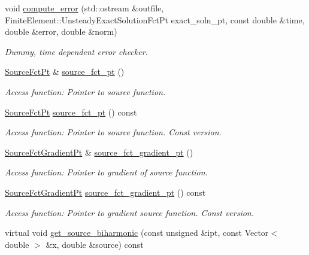 \begin{DoxyCompactItemize}
void \hyperlink{classoomph_1_1MyBiharmonicEquations_a617b8c8dc3dbac7aeb9d466f6da4edb9}{compute\+\_\+error} (std\+::ostream \&outfile, Finite\+Element\+::\+Unsteady\+Exact\+Solution\+Fct\+Pt exact\+\_\+soln\+\_\+pt, const double \&time, double \&error, double \&norm)
\begin{DoxyCompactList}\small\item\em Dummy, time dependent error checker. \end{DoxyCompactList}\item 
\hyperlink{classoomph_1_1MyBiharmonicEquations_a17bd58054c66229016eb1c52eab36bc1}{Source\+Fct\+Pt} \& \hyperlink{classoomph_1_1MyBiharmonicEquations_afbb201cb342fef337cfce82a776fa2b3}{source\+\_\+fct\+\_\+pt} ()
\begin{DoxyCompactList}\small\item\em Access function\+: Pointer to source function. \end{DoxyCompactList}\item 
\hyperlink{classoomph_1_1MyBiharmonicEquations_a17bd58054c66229016eb1c52eab36bc1}{Source\+Fct\+Pt} \hyperlink{classoomph_1_1MyBiharmonicEquations_a1c2d7933266cf773e3729fb236bc13be}{source\+\_\+fct\+\_\+pt} () const
\begin{DoxyCompactList}\small\item\em Access function\+: Pointer to source function. Const version. \end{DoxyCompactList}\item 
\hyperlink{classoomph_1_1MyBiharmonicEquations_af007c03701e888fed7375cb4537f0046}{Source\+Fct\+Gradient\+Pt} \& \hyperlink{classoomph_1_1MyBiharmonicEquations_a9da77a58e4d4a96e6cfe1eb708bca631}{source\+\_\+fct\+\_\+gradient\+\_\+pt} ()
\begin{DoxyCompactList}\small\item\em Access function\+: Pointer to gradient of source function. \end{DoxyCompactList}\item 
\hyperlink{classoomph_1_1MyBiharmonicEquations_af007c03701e888fed7375cb4537f0046}{Source\+Fct\+Gradient\+Pt} \hyperlink{classoomph_1_1MyBiharmonicEquations_a3c6a713fdc0847a374c58ef4760046ec}{source\+\_\+fct\+\_\+gradient\+\_\+pt} () const
\begin{DoxyCompactList}\small\item\em Access function\+: Pointer to gradient source function. Const version. \end{DoxyCompactList}\item 
virtual void \hyperlink{classoomph_1_1MyBiharmonicEquations_ad8decaf798d0f279affc5ffebbb4ace2}{get\+\_\+source\+\_\+biharmonic} (const unsigned \&ipt, const Vector$<$ double $>$ \&x, double \&source) const

\end{DoxyCompactItemize}
